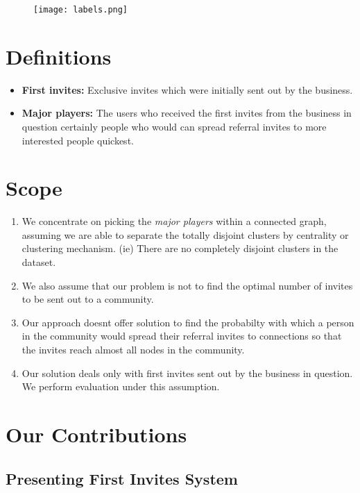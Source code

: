 \documentclass[letterpaper,twocolumn,11pt]{article}
\begin{document}
\begin{figure}[H]
\begin{center}
\texttt{[image: labels.png]}
\label{fig:referral}
\end{center}
\end{figure}

\section{Definitions}
\begin{itemize}
\item \textbf{First invites:} Exclusive invites which were initially sent out by the business. 
\item \textbf{Major players:} The users who received the first invites from the business in question certainly people who would can spread referral invites to more interested people quickest.
\end{itemize}
 
\section{Scope}
\begin{enumerate}
\item We concentrate on picking the \emph{major players} within a connected graph, assuming we are able to separate the totally disjoint clusters by centrality or clustering mechanism. (ie) There are no completely disjoint clusters in the dataset. 
\item We also assume that our problem is not to find the optimal number of invites to be sent out to a community. 
\item Our approach doesnt offer solution to find the probabilty with which a person in the community would spread their referral invites to connections so that the invites reach almost all nodes in the community.
\item Our solution deals only with first invites sent out by the business in question. We perform evaluation under this assumption.
\end{enumerate}

\section{Our Contributions}
\subsection{Presenting First Invites System}
\end{document}
